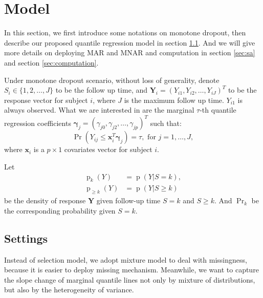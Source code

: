 \documentclass[12pt]{article}
\DeclareMathOperator{\pr}{p}
\DeclareMathOperator{\prob}{Pr}
\begin{document}
\section{Model}
\label{sec:model}

In this section, we first introduce some notations on monotone
dropout, then describe our proposed quantile regression model in
section \ref{sec:settings}. And we will give more details on deploying
MAR and MNAR and computation in section \ref{sec:sa} and section
\ref{sec:computation}.

Under monotone dropout scenario, without loss of generality, denote
$S_i \in \{1, 2, \ldots, J\}$ to be the follow up time, and $\bm Y_i =
(Y_{i1}, Y_{i2}, \ldots, Y_{iJ})^{T}$ to be the response vector for
subject $i$, where $J$ is the maximum follow up time. $Y_{i1}$ is
always observed. What we are interested in are the marginal $\tau$-th
quantile regression coefficients $\bm \gamma_j = (\gamma_{j0}, \gamma_{j2}, \ldots,
\gamma_{jp})^T$ such that:
\begin{equation}
  \label{eq:quantile}
  \prob (Y_{ij} \leq \bm x_i^{T} \bm \gamma_j ) = \tau, \text{ for } j = 1, \ldots, J,
\end{equation}
where $\bm x_i$ is a $p \times 1$ covariates vector for subject $i$.

Let
\begin{align*}
  \pr_k(Y) &= \pr (Y | S = k), \\
  \pr_{\geq k} (Y) & = \pr (Y | S \geq k)
\end{align*}
be the density of response $\bm Y$ given follow-up time $S=k$ and $S \geq
k$. And $\prob_k$ be the corresponding probability given $S = k$.

\subsection{Settings}
\label{sec:settings}
Instead of selection model, we adopt mixture model to deal with
missingness, because it is easier to deploy missing
mechanism. Meanwhile, we want to capture the slope change of marginal
quantile lines not only by mixture of distributions, but also by the
heterogeneity of variance.
\end{document}
